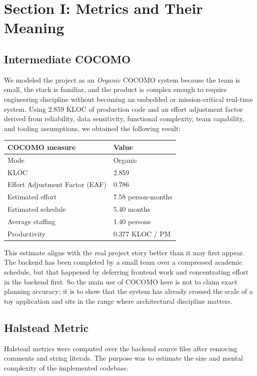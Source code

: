 \documentclass[11pt,a4paper]{article}
\begin{document}
\section{Section I: Metrics and Their Meaning}
\subsection{Intermediate COCOMO}
We modeled the project as an \emph{Organic} COCOMO system because the team is small, the stack is familiar, and the product is complex enough to require engineering discipline without becoming an embedded or mission-critical real-time system. Using 2.859 KLOC of production code and an effort adjustment factor derived from reliability, data sensitivity, functional complexity, team capability, and tooling assumptions, we obtained the following result:

\begin{center}
\begin{tabular}{|p{7cm}|p{4cm}|}
\hline
\rowcolor{SoftBlue}
\textbf{COCOMO measure} & \textbf{Value} \\
\hline
Mode & Organic \\
KLOC & 2.859 \\
Effort Adjustment Factor (EAF) & 0.786 \\
Estimated effort & 7.58 person-months \\
Estimated schedule & 5.40 months \\
Average staffing & 1.40 persons \\
Productivity & 0.377 KLOC / PM \\
\hline
\end{tabular}
\end{center}

This estimate aligns with the real project story better than it may first appear. The backend has been completed by a small team over a compressed academic schedule, but that happened by deferring frontend work and concentrating effort in the backend first. So the main use of COCOMO here is not to claim exact planning accuracy; it is to show that the system has already crossed the scale of a toy application and sits in the range where architectural discipline matters.

\subsection{Halstead Metric}
Halstead metrics were computed over the backend source files after removing comments and string literals. The purpose was to estimate the size and mental complexity of the implemented codebase.
\end{document}
